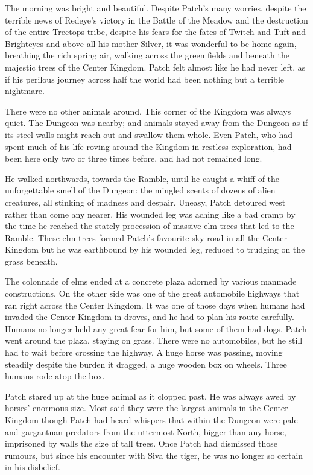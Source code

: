 \documentclass[12pt]{book}
\begin{document}
The morning was bright and beautiful. Despite Patch's many worries, despite the terrible news of Redeye's victory in the Battle of the Meadow and the destruction of the entire Treetops tribe, despite his fears for the fates of Twitch and Tuft and Brighteyes and above all his mother Silver, it was wonderful to be home again, breathing the rich spring air, walking across the green fields and beneath the majestic trees of the Center Kingdom. Patch felt almost like he had never left, as if his perilous journey across half the world had been nothing but a terrible nightmare.

There were no other animals around. This corner of the Kingdom was always quiet. The Dungeon was nearby; and animals stayed away from the Dungeon as if its steel walls might reach out and swallow them whole. Even Patch, who had spent much of his life roving around the Kingdom in restless exploration, had been here only two or three times before, and had not remained long. 

He walked northwards, towards the Ramble, until he caught a whiff of the unforgettable smell of the Dungeon: the mingled scents of dozens of alien creatures, all stinking of madness and despair. Uneasy, Patch detoured west rather than come any nearer. His wounded leg was aching like a bad cramp by the time he reached the stately procession of massive elm trees that led to the Ramble. These elm trees formed Patch's favourite sky-road in all the Center Kingdom %
but he was earthbound by his wounded leg, reduced to trudging on the grass beneath.

The colonnade of elms ended at a concrete plaza adorned by various manmade constructions. On the other side was one of the great automobile highways that ran right across the Center Kingdom. It was one of those days when humans had invaded the Center Kingdom in droves, and he had to plan his route carefully. Humans no longer held any great fear for him, but some of them had dogs. Patch went around the plaza, staying on grass. There were no automobiles, but he still had to wait before crossing the highway. A huge horse was passing, moving steadily despite the burden it dragged, a huge wooden box on wheels. Three humans rode atop the box.

Patch stared up at the huge animal as it clopped past. He was always awed by horses' enormous size. Most said they were the largest animals in the Center Kingdom %
though Patch had heard whispers that within the Dungeon were pale and gargantuan predators from the uttermost North, bigger than any horse, imprisoned by walls the size of tall trees. Once Patch had dismissed those rumours, but since his encounter with Siva the tiger, he was no longer so certain in his disbelief.
\end{document}
